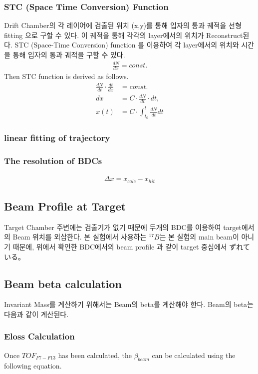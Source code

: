 \subsubsection{STC (Space Time Conversion) Function}
Drift Chamber의 각 레이어에 검출된 위치 (x,y)를 통해 입자의 통과 궤적을 선형 fitting 으로 구할 수 있다. 이 궤적을 통해 각각의 layer에서의 위치가 Reconstruct된다.  STC (Space-Time Conversion) function 를 이용하여 각 layer에서의 위치와 시간을 통해 입자의 통과 궤적을 구할 수 있다. 
\begin{align}
    \frac{dN}{dx} = const.  
\end{align}
Then STC function is derived as follows.
\begin{align}
    \frac{dN}{dt} \cdot \frac{dt}{dx} &= const.\\
    dx &= C \cdot \frac{dN}{dt} \cdot dt,\\
    x(t) &= C \cdot \int_{t_{0}}^{t} \frac{dN}{dt} dt
\end{align}
\subsubsection{linear fitting of trajectory}

\subsubsection{The resolution of BDCs}

\begin{align}
    \Delta x = x_{calc} - x_{hit}
\end{align}
    \subsection{Beam Profile at Target}
    Target Chamber 주변에는 검출기가 없기 때문에 두개의 BDC를 이용하여 target에서의 Beam 위치를 외삽한다. 본 실험에서 사용하는 ${}^{17}B$는 본 실험의 main beam이 아니기 때문에, 위에서 확인한 BDC에서의 beam profile 과 같이 target 중심에서 ずれている。





\subsection{Beam beta calculation}
Invariant Mass를 계산하기 위해서는 Beam의 beta를 계산해야 한다. Beam의 beta는 다음과 같이 계산된다.

\subsubsection{Eloss Calculation}
Once $TOF_{F7-F13}$ has been calculated, the $\beta_{beam}$ can be calculated using the following equation. 

